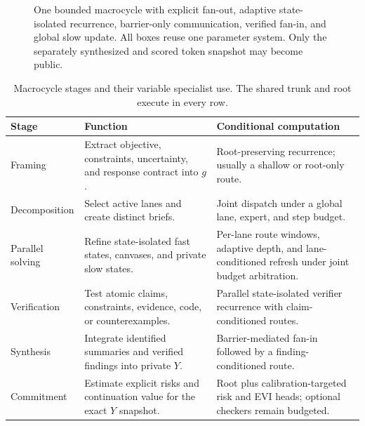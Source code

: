 \documentclass[10pt,a4paper]{article}
\begin{document}
\begin{figure}[htbp]
\caption{One bounded macrocycle with explicit fan-out, adaptive state-isolated
recurrence, barrier-only communication, verified fan-in, and global slow
update. All boxes reuse one parameter system. Only the separately synthesized
and scored token snapshot may become public.}
\label{fig:macrocycle}
\end{figure}

\begin{table}[htbp]
\caption{Macrocycle stages and their variable specialist use. The shared trunk
and root execute in every row.}
\label{tab:stages}
\centering\small
\begin{tabularx}{\textwidth}{@{}lXX@{}}
\toprule
\textbf{Stage} & \textbf{Function} & \textbf{Conditional computation} \\
\midrule
Framing & Extract objective, constraints, uncertainty, and response contract into $g$. & Root-preserving recurrence; usually a shallow or root-only route. \\
Decomposition & Select active lanes and create distinct briefs. & Joint dispatch under a global lane, expert, and step budget. \\
Parallel solving & Refine state-isolated fast states, canvases, and private slow states. & Per-lane route windows, adaptive depth, and lane-conditioned refresh under joint budget arbitration. \\
Verification & Test atomic claims, constraints, evidence, code, or counterexamples. & Parallel state-isolated verifier recurrence with claim-conditioned routes. \\
Synthesis & Integrate identified summaries and verified findings into private $Y$. & Barrier-mediated fan-in followed by a finding-conditioned route. \\
Commitment & Estimate explicit risks and continuation value for the exact $Y$ snapshot. & Root plus calibration-targeted risk and EVI heads; optional checkers remain budgeted. \\
\bottomrule
\end{tabularx}
\end{table}
\end{document}
